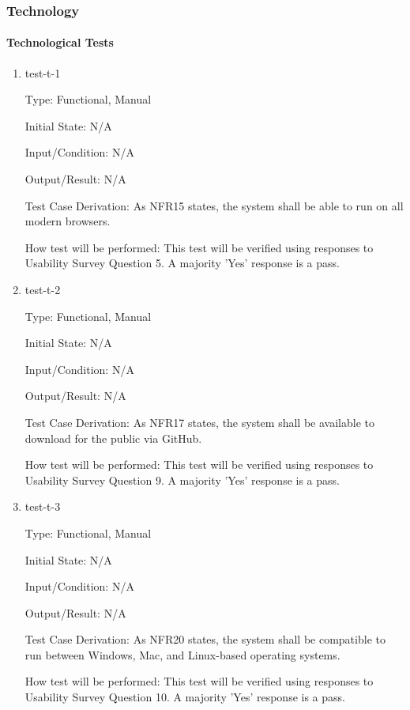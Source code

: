 \documentclass[12pt, titlepage]{article}
\begin{document}
\subsubsection{Technology}

\paragraph{Technological Tests}

\begin{enumerate}

\item{test-t-1\\}

Type: Functional, Manual
					
Initial State: N/A
					
Input/Condition: N/A
					
Output/Result: N/A

Test Case Derivation: As NFR15 states, the system shall be able to run on all modern browsers.
					
How test will be performed: This test will be verified using responses to Usability Survey Question 5. A majority 'Yes' response is a pass.

\item{test-t-2\\}

Type: Functional, Manual
					
Initial State: N/A
					
Input/Condition: N/A
					
Output/Result: N/A

Test Case Derivation: As NFR17 states, the system shall be available to download for the public via GitHub.
					
How test will be performed: This test will be verified using responses to Usability Survey Question 9. A majority 'Yes' response is a pass.

\item{test-t-3\\}

Type: Functional, Manual
					
Initial State: N/A
					
Input/Condition: N/A
					
Output/Result: N/A

Test Case Derivation: As NFR20 states, the system shall be compatible to run between Windows, Mac, and Linux-based operating systems.
					
How test will be performed: This test will be verified using responses to Usability Survey Question 10. A majority 'Yes' response is a pass.


\end{enumerate}
\end{document}
